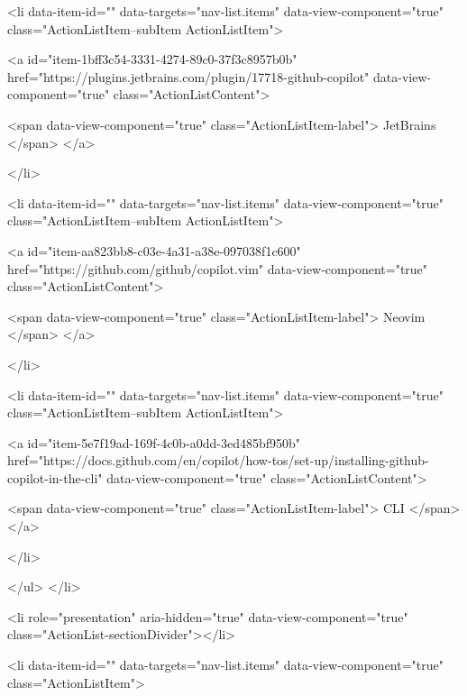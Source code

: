           
<li data-item-id="" data-targets="nav-list.items" data-view-component="true" class="ActionListItem--subItem ActionListItem">
    
    
    <a id="item-1bff3c54-3331-4274-89c0-37f3c8957b0b" href="https://plugins.jetbrains.com/plugin/17718-github-copilot" data-view-component="true" class="ActionListContent">
      
        <span data-view-component="true" class="ActionListItem-label">
          JetBrains
</span>      
</a>
  
</li>

          
<li data-item-id="" data-targets="nav-list.items" data-view-component="true" class="ActionListItem--subItem ActionListItem">
    
    
    <a id="item-aa823bb8-c03e-4a31-a38e-097038f1c600" href="https://github.com/github/copilot.vim" data-view-component="true" class="ActionListContent">
      
        <span data-view-component="true" class="ActionListItem-label">
          Neovim
</span>      
</a>
  
</li>

          
<li data-item-id="" data-targets="nav-list.items" data-view-component="true" class="ActionListItem--subItem ActionListItem">
    
    
    <a id="item-5e7f19ad-169f-4c0b-a0dd-3ed485bf950b" href="https://docs.github.com/en/copilot/how-tos/set-up/installing-github-copilot-in-the-cli" data-view-component="true" class="ActionListContent">
      
        <span data-view-component="true" class="ActionListItem-label">
          CLI
</span>      
</a>
  
</li>

</ul>
</li>

        
          <li role="presentation" aria-hidden="true" data-view-component="true" class="ActionList-sectionDivider"></li>
        
          
<li data-item-id="" data-targets="nav-list.items" data-view-component="true" class="ActionListItem">
    
